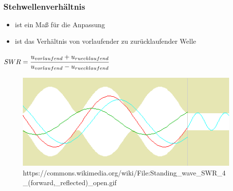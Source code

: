 \begin{frame}
  \frametitle{Stehwellenverhältnis}
  \begin{itemize}
    \item ist ein Maß für die Anpassung
    \item ist das Verhältnis von vorlaufender zu zurücklaufender Welle
  \end{itemize}
  \begin{block}{}
    \centering $SWR = \cfrac{u_{vorlaufend}+u_{ruecklaufend}}{u_{vorlaufend}-u_{ruecklaufend}}$
  \end{block}
  \begin{center}
    \begin{figure}
      \includegraphics[width=\textwidth,height=0.3\textheight,keepaspectratio]{e10/Stehwelle-10.png}
           {https://commons.wikimedia.org/wiki/File:Standing_wave_SWR_4_(forward,_reflected)_open.gif}{\cczero}
    \end{figure}
  \end{center}
\end{frame}

